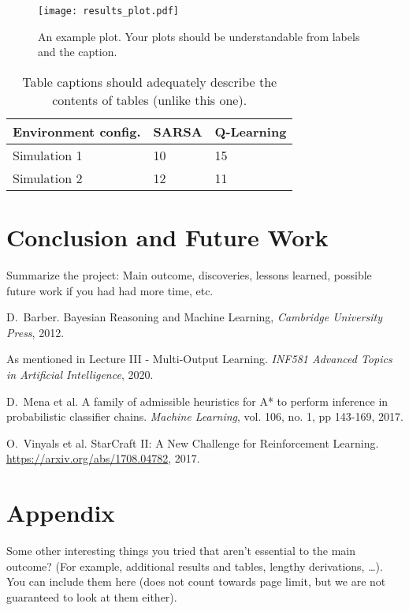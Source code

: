 \documentclass[journal, a4paper]{IEEEtran}
\begin{document}
\begin{figure}[ht]
	\centering
	\texttt{[image: results\_plot.pdf]}
	\caption{\label{results_figure}An example plot. Your plots should be understandable from labels and the caption.}
\end{figure}

\begin{table}[ht]
	\caption{\label{results_table}Table captions should adequately describe the contents of tables (unlike this one).}
	\centering
	\begin{tabular}{lll}
		\hline
		\textbf{Environment config.} & \textbf{SARSA} & \textbf{Q-Learning}  \\
		\hline
		Simulation 1        & 10             & 15 \\
		Simulation 2        & 12             & 11 \\
		\hline
	\end{tabular}
\end{table}

\section{Conclusion and Future Work}
	Summarize the project: Main outcome, discoveries, lessons learned, possible future work if you had had more time, etc. %

\begin{thebibliography}{4}

	D.~Barber. Bayesian Reasoning and Machine Learning,
	{\em Cambridge University Press}, 2012.

		As mentioned in Lecture III - Multi-Output Learning. \textit{INF581 Advanced Topics in Artificial Intelligence}, 2020.

	D.~Mena et al. A family of admissible heuristics for A* to perform inference in probabilistic classifier chains.
	{\em Machine Learning}, vol. 106, no. 1, pp 143-169, 2017.

	O.~Vinyals et al. StarCraft {II:} {A} New Challenge for Reinforcement Learning.
	\url{https://arxiv.org/abs/1708.04782}, 2017. 

\end{thebibliography}

\newpage
\section*{Appendix}
Some other interesting things you tried that aren't essential to the main outcome? (For example, additional results and tables, lengthy derivations, \ldots). You can include them here (does not count towards page limit, but we are not guaranteed to look at them either). 
\end{document}

